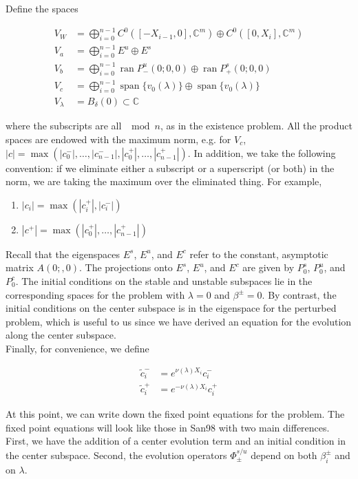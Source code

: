 \documentclass[12pt]{article}
\def\C{{\mathbb C}}
\DeclareMathOperator{\spn}{span}
\DeclareMathOperator{\ran}{ran}
\begin{document}
Define the spaces

\begin{align*}
V_W &= \bigoplus_{i=0}^{n-1} C^0([-X_{i-1}, 0], \C^m) \oplus C^0([0, X_i], \C^m) \\
V_a &= \bigoplus_{i=0}^{n-1} E^u \oplus E^s\\
V_b &= \bigoplus_{i=0}^{n-1} \ran P^u_-(0; 0, 0) \oplus \ran P^s_+(0; 0, 0) \\
V_c &= \bigoplus_{i=0}^{n-1} \spn \{v_0(\lambda)\} \oplus \spn \{v_0(\lambda)\} \\
V_\lambda &= B_\delta(0) \subset \C
\end{align*}

where the subscripts are all $\mod n$, as in the existence problem. All the product spaces are endowed with the maximum norm, e.g. for $V_c$, $|c| = \max(|c_0^-|, \dots, |c_{n-1}^-|, |c_0^+|, \dots, |c_{n-1}^+|)$. In addition, we take the following convention: if we eliminate either a subscript or a superscript (or both) in the norm, we are taking the maximum over the eliminated thing. For example,
\begin{enumerate}
	\item $|c_i| = \max(|c_i^+|, |c_i^-|)$ 
	\item $|c^+| = \max(|c_0^+|, \dots, |c_{n-1}^+|)$
\end{enumerate} 

Recall that the eigenspaces $E^s$, $E^u$, and $E^c$ refer to the constant, asymptotic matrix $A(0;, 0)$. The projections onto $E^s$, $E^u$, and $E^c$ are given by $P_0^s$, $P_0^u$, and $P_0^c$. The initial conditions on the stable and unstable subspaces lie in the corresponding spaces for the problem with $\lambda = 0$ and $\beta^\pm = 0$. By contrast, the initial conditions on the center subspace is in the eigenspace for the perturbed problem, which is useful to us since we have derived an equation for the evolution along the center subspace.\\

Finally, for convenience, we define

\begin{align*}
\tilde{c}_i^- &= e^{\nu(\lambda)X_i} c_i^- \\
\tilde{c}_i^+ &= e^{-\nu(\lambda)X_i} c_i^+
\end{align*}

At this point, we can write down the fixed point equations for the problem. The fixed point equations will look like those in San98 with two main differences. First, we have the addition of a center evolution term and an initial condition in the center subspace. Second, the evolution operators $\Phi^{s/u}_\pm$ depend on both $\beta_i^\pm$ and on $\lambda$.\\
\end{document}
